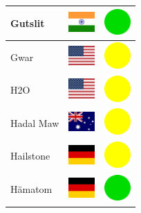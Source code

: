 \documentclass[12pt, a4paper, twoside]{report}
\begin{document}
\begin{center}
\begin{longtable}{|p{5cm}|p{2cm}|p{2cm}|}
Gutslit & \includegraphics[width=1cm]{4x3/in} & \includegraphics[width=1cm]{likes/y} \\ \hline
Gwar & \includegraphics[width=1cm]{4x3/us} & \includegraphics[width=1cm]{likes/m} \\ \hline
H2O & \includegraphics[width=1cm]{4x3/us} & \includegraphics[width=1cm]{likes/m} \\ \hline
Hadal Maw & \includegraphics[width=1cm]{4x3/au} & \includegraphics[width=1cm]{likes/m} \\ \hline
Hailstone & \includegraphics[width=1cm]{4x3/de} & \includegraphics[width=1cm]{likes/m} \\ \hline
Hämatom & \includegraphics[width=1cm]{4x3/de} & \includegraphics[width=1cm]{likes/y} \\ \hline

\end{longtable}
\end{center}
\end{document}
